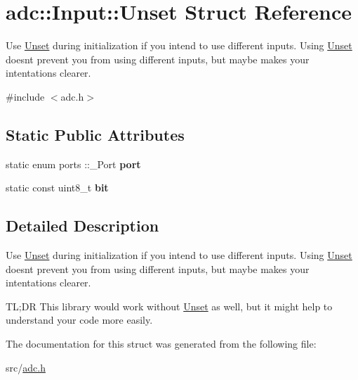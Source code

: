 \hypertarget{structadc_1_1Input_1_1Unset}{}\section{adc\+:\+:Input\+:\+:Unset Struct Reference}
\label{structadc_1_1Input_1_1Unset}


Use \hyperlink{structadc_1_1Input_1_1Unset}{Unset} during initialization if you intend to use different inputs. Using \hyperlink{structadc_1_1Input_1_1Unset}{Unset} doesn\textquotesingle{}t prevent you from using different inputs, but maybe makes your intentations clearer.  




{\ttfamily \#include $<$adc.\+h$>$}

\subsection*{Static Public Attributes}
\begin{DoxyCompactItemize}
\item 
\hypertarget{structadc_1_1Input_1_1Unset_a868a4d7db05686d8b09a4a5f9ca3f863}{}\label{structadc_1_1Input_1_1Unset_a868a4d7db05686d8b09a4a5f9ca3f863} 
static enum ports \+::\+\_\+\+Port {\bfseries port}
\item 
\hypertarget{structadc_1_1Input_1_1Unset_a8fd44d9636034cbba06a1673af4dfa1a}{}\label{structadc_1_1Input_1_1Unset_a8fd44d9636034cbba06a1673af4dfa1a} 
static const uint8\+\_\+t {\bfseries bit}
\end{DoxyCompactItemize}


\subsection{Detailed Description}
Use \hyperlink{structadc_1_1Input_1_1Unset}{Unset} during initialization if you intend to use different inputs. Using \hyperlink{structadc_1_1Input_1_1Unset}{Unset} doesn\textquotesingle{}t prevent you from using different inputs, but maybe makes your intentations clearer. 

TL;DR This library would work without \hyperlink{structadc_1_1Input_1_1Unset}{Unset} as well, but it might help to understand your code more easily. 

The documentation for this struct was generated from the following file\+:\begin{DoxyCompactItemize}
\item 
src/\hyperlink{adc_8h}{adc.\+h}\end{DoxyCompactItemize}
